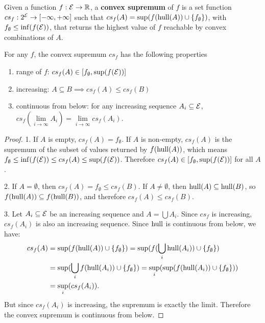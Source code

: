 \begin{mathSection}
\begin{defn}
	Given a function $f : \mathcal{E} \to \mathbb{R}$, a \textbf{convex supremum} of $f$ is a set function $cs_f : 2^{\mathcal{E}} \to [- \infty, + \infty]$ such that $cs_f(A) = \sup(f(\mathrm{hull}(A)) \cup \{f_{\emptyset}\})$, with $f_{\emptyset} \leq \inf(f(\mathcal{E}))$, that returns the highest value of $f$ reachable by convex combinations of $A$.
\end{defn}

\begin{prop}\label{pm-es-convexSupremumProps}
	For any $f$, the convex supremum $cs_f$ has the following properties
	\begin{enumerate}
		\item range of $f$: $cs_f(A) \in [f_{\emptyset}, \sup(f(\mathcal{E}))]$
		\item increasing: $A \subseteq B \implies cs_f(A) \leq cs_f(B)$
		\item continuous from below: for any increasing sequence $A_i \subseteq \mathcal{E}$, $cs_f(\lim\limits_{i \to \infty} A_i) = \lim\limits_{i \to \infty} cs_f(A_i)$.
	\end{enumerate}
\end{prop}

\begin{proof}
	1. If $A$ is empty, $cs_f(A) = f_{\emptyset}$. If $A$ is non-empty, $cs_f(A)$ is the supremum of the subset of values returned by $f(\mathrm{hull}(A))$, which means $f_{\emptyset} \leq \inf(f(\mathcal{E})) \leq cs_f(A) \leq \sup(f(\mathcal{E}))$. Therefore $cs_f(A) \in [f_{\emptyset}, \sup(f(\mathcal{E}))]$ for all $A$.

	2. If $A=\emptyset$, then $cs_f(A)=f_{\emptyset}\leq cs_f(B)$. If $A\neq\emptyset$, then $\mathrm{hull}(A)\subseteq\mathrm{hull}(B)$, so $f(\mathrm{hull}(A))\subseteq f(\mathrm{hull}(B))$, and therefore $cs_f(A)\leq cs_f(B)$.
	
	3. Let $A_i \subseteq \mathcal{E}$ be an increasing sequence and $A = \bigcup A_i$. Since $cs_f$ is increasing, $cs_f(A_i)$ is also an increasing sequence. Since $\mathrm{hull}$ is continuous from below, we have:
	\begin{equation}
		\begin{aligned}
			cs_f(A) &= \sup(f(\mathrm{hull}(A))\cup\{f_{\emptyset}\}) = \sup(f(\bigcup_i\mathrm{hull}(A_i))\cup\{f_{\emptyset}\})\\
			&= \sup(\bigcup_i f(\mathrm{hull}(A_i))\cup\{f_{\emptyset}\}) = \sup_i(\sup(f(\mathrm{hull}(A_i))\cup\{f_{\emptyset}\})) \\
			&= \sup_i(cs_f(A_i)).
		\end{aligned}
	\end{equation}
	But since $cs_f(A_i)$ is increasing, the supremum is exactly the limit. Therefore the convex supremum is continuous from below.
\end{proof}


\end{mathSection}
